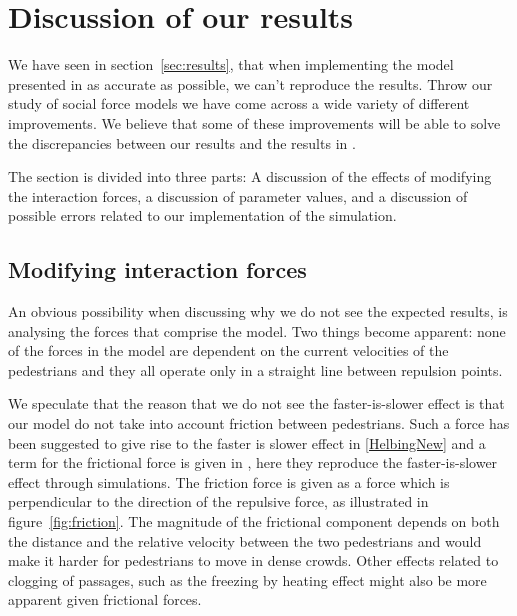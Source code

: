 \section{Discussion of our results}
\label{sec:discussion}
We have seen in section~\ref{sec:results}, that when implementing the model presented in \cite{self-org} as accurate as possible, we can't reproduce the results. Throw our study of social force models we have come across a wide variety of different improvements. We believe that some of these improvements will be able to solve the discrepancies between our results and the results in \cite{self-org}.
 
The section is divided into three parts: A discussion of the effects of modifying  
the interaction forces, a discussion of parameter values, and a 
discussion of possible errors related to our implementation of the simulation.

\subsection{Modifying interaction forces}
\label{sec:new-forces}
An obvious possibility when discussing why we do not see the expected results, 
is analysing the forces that comprise the model. Two things become apparent: 
none of the forces in the model are dependent on the current velocities of the 
pedestrians and they all operate only in a straight line between repulsion 
points. 

We speculate that the reason that we do not see the faster-is-slower effect is that our model do not take into account friction between pedestrians. Such a force has been suggested to give rise to the faster is slower effect in \ref{HelbingNew} and a term for the frictional force is given in \cite{helbing00}, here they reproduce the faster-is-slower effect through simulations. The friction force is given as a force which is perpendicular to the direction of the repulsive force, as illustrated in 
figure~\ref{fig:friction}. The magnitude of the frictional component depends 
on both the distance and the relative velocity between the two pedestrians and 
would make it harder for pedestrians to move in dense crowds.  Other 
effects related to clogging of passages, such as the freezing by heating 
effect might also be more apparent given frictional forces.

